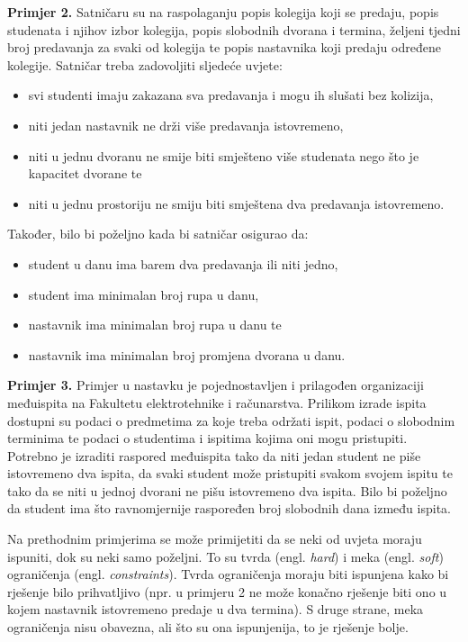 \documentclass[times, utf8, zavrsni]{fer}
\begin{document}
\textbf{Primjer 2.} Satničaru su na raspolaganju popis kolegija koji se predaju, popis studenata i njihov izbor kolegija, popis slobodnih dvorana i termina,
željeni tjedni broj predavanja za svaki od kolegija te popis nastavnika koji predaju određene kolegije. Satničar treba zadovoljiti
sljedeće uvjete:
\begin{itemize}
  \item svi studenti imaju zakazana sva predavanja i mogu ih slušati bez kolizija,
  \item niti jedan nastavnik ne drži više predavanja istovremeno,
  \item niti u jednu dvoranu ne smije biti smješteno više studenata nego što je kapacitet dvorane te
  \item niti u jednu prostoriju ne smiju biti smještena dva predavanja istovremeno.
\end{itemize}
Također, bilo bi poželjno kada bi satničar osigurao da:
\begin{itemize}
  \item student u danu ima barem dva predavanja ili niti jedno,
  \item student ima minimalan broj rupa u danu,
  \item nastavnik ima minimalan broj rupa u danu te
  \item nastavnik ima minimalan broj promjena dvorana u danu.
\end{itemize}

\textbf{Primjer 3.}
Primjer u nastavku je pojednostavljen i prilagođen organizaciji međuispita na Fakultetu elektrotehnike i računarstva.
Prilikom izrade ispita dostupni su podaci o predmetima za koje treba održati ispit, podaci o slobodnim terminima te
podaci o studentima i ispitima kojima oni mogu pristupiti. Potrebno je izraditi raspored međuispita tako da niti jedan
student ne piše istovremeno dva ispita, da svaki student može pristupiti svakom svojem ispitu
te tako da se niti u jednoj dvorani ne pišu istovremeno dva ispita. Bilo bi poželjno
da student ima što ravnomjernije raspoređen broj slobodnih dana između ispita.

Na prethodnim primjerima se može primijetiti da se neki od uvjeta moraju ispuniti, dok su neki samo poželjni. To su tvrda
(engl. \textit{hard}) i meka (engl. \textit{soft}) ograničenja (engl. \textit{constraints}). Tvrda ograničenja moraju biti ispunjena kako bi rješenje bilo prihvatljivo (npr. u primjeru 2 ne može konačno rješenje biti ono u kojem nastavnik istovremeno predaje u dva termina). S druge strane, meka ograničenja nisu obavezna, ali što su ona ispunjenija, to je rješenje bolje.
\end{document}
